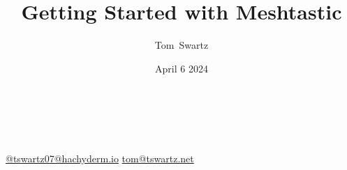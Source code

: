 \documentclass[aspectratio=169]{beamer}
\title{Getting Started with Meshtastic}
\author[Swartz]{Tom~Swartz}
\institute{Central PA Open Source Conference}
\date{April 6 2024}
\begin{document}

{
\begin{frame}[plain]
    \begin{TitleBox}
        \begin{center}
            {\color{red}\Large\inserttitle\color{black}}\\
        \end{center}
        \insertauthor{}\hfill\textbf{\insertinstitute{}}\hfill\insertdate{}\\
        {\footnotesize
        \href{https://hachyderm.io/@tswartz07}{@tswartz07@hachyderm.io}
        \hfill{}
        \href{mailto: tom@tswartz.net}{tom@tswartz.net}
        }
    \end{TitleBox}
    \vspace{15em}
\end{frame}}
\end{document}
